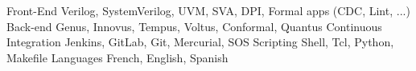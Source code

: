 

\begin{cvskills}

  \cvskill
    {Front-End} %
    {Verilog, SystemVerilog, UVM, SVA, DPI, Formal apps (CDC, Lint, ...)} %
  \cvskill
    {Back-end} %
    {Genus, Innovus, Tempus, Voltus, Conformal, Quantus} %
  \cvskill
    {Continuous Integration} %
    {Jenkins, GitLab, Git, Mercurial, SOS} %
  \cvskill
    {Scripting} %
    {Shell, Tcl, Python, Makefile} %
  \cvskill
    {Languages} %
    {French, English, Spanish} %

\end{cvskills}
